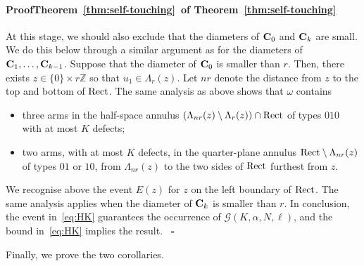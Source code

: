 \documentclass[a4paper,oneside,11pt]{article}
\numberwithin{equation}{section}
\numberwithin{equation}{section}
\numberwithin{equation}{section}
\newenvironment{proof}[1][\relax]%
  {\paragraph{Proof\ifx#1\relax\else~of #1\fi}}%
  {~\hfill$\square$\par\bigskip}
\newcommand{\calG}{\mathcal{G}}
\newcommand{\bbZ}{\mathbb{Z}}
\newcommand{\La}{\Lambda}
\begin{document}
\begin{proof}[Theorem~\ref{thm:self-touching}]
	At this stage, we should also exclude that the diameters of ${\bf C}_0$ and ${\bf C}_k$ are small. 
	We do this below through a similar argument as for the diameters of ${\bf C}_1,\dots, {\bf C}_{k-1}$.
	Suppose that the diameter of ${\bf C}_0$ is smaller than $r$. 
	Then, there exists $z \in \{0\}\times r\bbZ$ so that $u_1 \in \La_r(z)$. 
	Let $nr$ denote the distance from $z$ to the top and bottom of ${\rm Rect}$. 
	The same analysis as above shows that $\omega$ contains 
	\begin{itemize}
    	\item[(b')] three arms in the half-space annulus $(\La_{nr}(z)\setminus \La_{r}(z)) \cap \Rect$ of types $010$ with at most $K$ defects;
    	\item[(c')] two arms, with at most $K$ defects, in the quarter-plane annulus $\Rect \setminus \La_{nr}(z)$ of types $01$ or $10$, 
    	from $\La_{nr}(z)$ to the two sides of ${\rm Rect}$ furthest from $z$. 
	\end{itemize} 
	We recognise above the event $E(z)$ for $z$ on the left boundary of ${\rm Rect}$.
	The same analysis applies  when the diameter of ${\bf C}_k$ is smaller than $r$. 
	In conclusion, the event in~\eqref{eq:HK} guarantees the occurrence of $\calG(K,\alpha,N,\ell)$, and the bound in~\eqref{eq:HK} implies the result. 	
\end{proof}

Finally, we prove the two corollaries. 
\end{document}
